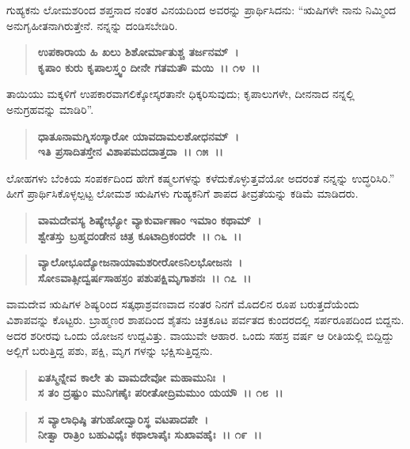 ಗುಹ್ಯಕನು ಲೋಮಶರಿಂದ ಶಪ್ತನಾದ ನಂತರ ವಿನಯದಿಂದ ಅವರನ್ನು ಪ್ರಾರ್ಥಿಸಿದನು: “ಋಷಿಗಳೇ ನಾನು ನಿಮ್ಮಿಂದ ಅನುಗೃಹೀತನಾಗಿರುತ್ತೇನೆ. ನನ್ನನ್ನು ದಂಡಿಸಬೇಡಿರಿ.

\begin{verse}
\textbf{ಉಪಕಾರಾಯ ಹಿ ಖಲು ಶಿಶೋರ್ಮಾತುಶ್ಚ ತರ್ಜನಮ್~।}\\\textbf{ಕೃಪಾಂ ಕುರು ಕೃಪಾಲಸ್ತ್ವಂ ದೀನೇ ಗತಮತೌ ಮಯಿ~।। ೧೪~।।}
\end{verse}

ತಾಯಿಯು ಮಕ್ಕಳಿಗೆ ಉಪಕಾರವಾಗಲಿಕ್ಕೋಸ್ಕರತಾನೇ ಧಿಕ್ಕರಿಸುವುದು; ಕೃಪಾಲುಗಳೇ, ದೀನನಾದ ನನ್ನಲ್ಲಿ ಅನುಗ್ರಹವನ್ನು ಮಾಡಿರಿ”.

\begin{verse}
\textbf{ಧಾತೂನಾಮಗ್ನಿಸಂಸ್ಕಾರೋ ಯಾವದಾಮಲಶೋಧನಮ್~।}\\\textbf{ಇತಿ ಪ್ರಸಾದಿತಸ್ತೇನ ವಿಶಾಪಮದದಾತ್ತದಾ~।। ೧೫~।।}
\end{verse}

ಲೋಹಗಳು ಬೆಂಕಿಯ ಸಂಪರ್ಕದಿಂದ ಹೇಗೆ ಕಷ್ಮಲಗಳನ್ನು ಕಳೆದುಕೊಳ್ಳುತ್ತವೆಯೋ ಅದರಂತೆ ನನ್ನನ್ನು ಉದ್ಧರಿಸಿರಿ.” ಹೀಗೆ ಪ್ರಾರ್ಥಿಸಿಕೊಳ್ಳಲ್ಪಟ್ಟ ಲೋಮಶ ಋಷಿಗಳು ಗುಹ್ಯಕನಿಗೆ ಶಾಪದ ತೀವ್ರತೆಯನ್ನು ಕಡಿಮೆ ಮಾಡಿದರು.

\begin{verse}
\textbf{ವಾಮದೇವಸ್ಯ ಶಿಷ್ಯೇಭ್ಯೋ ವ್ಯಾಕುರ್ವಾಣಾಂ ಇಮಾಂ ಕಥಾಮ್~।}\\\textbf{ಶ್ವೇತಸ್ತು ಬ್ರಹ್ಮದಂಡೇನ ಚಿತ್ರ ಕೂಟಾದ್ರಿಕಂದರೇ~।। ೧೬~।।}
\end{verse}

\begin{verse}
\textbf{ವ್ಯಾಲೋಭೂದ್ಯೋಜನಾಯಾಮಶರೀರೋಽನಿಲಭೋಜನಃ~।}\\\textbf{ಸೋಽವಾತ್ಸೀದ್ವರ್ಷಸಾಹಸ್ರಂ ಪಶುಪಕ್ಷಿಮೃಗಾಶನಃ~।। ೧೭~।।}
\end{verse}

ವಾಮದೇವ ಋಷಿಗಳ ಶಿಷ್ಯರಿಂದ ಸತ್ಕಥಾಶ್ರವಣವಾದ ನಂತರ ನಿನಗೆ ಮೊದಲಿನ ರೂಪ ಬರುತ್ತದೆಯೆಂದು ವಿಶಾಪವನ್ನು ಕೊಟ್ಟರು. ಬ್ರಾಹ್ಮಣರ ಶಾಪದಿಂದ ಶೈತನು ಚಿತ್ರಕೂಟ ಪರ್ವತದ ಕುಂದರದಲ್ಲಿ ಸರ್ಪರೂಪದಿಂದ ಬಿದ್ದನು. ಅದರ ಶರೀರವು ಒಂದು ಯೋಜನ ಉದ್ದವಿತ್ತು. ವಾಯುವೇ ಆಹಾರ. ಒಂದು ಸಹಸ್ರ ವರ್ಷ ಆ ರೀತಿಯಲ್ಲಿ ಬಿದ್ದಿದ್ದು ಅಲ್ಲಿಗೆ ಬರುತ್ತಿದ್ದ ಪಶು, ಪಕ್ಷಿ, ಮೃಗ ಗಳನ್ನು ಭಕ್ಷಿಸುತ್ತಿದ್ದನು.

\begin{verse}
\textbf{ಏತಸ್ಮಿನ್ನೇವ ಕಾಲೇ ತು ವಾಮದೇವೋ ಮಹಾಮುನಿಃ~।}\\\textbf{ಸ ತಂ ದ್ರಷ್ಟುಂ ಮುನಿಗಣೈಃ ಪರೀತೋದ್ರಿಮಮುಂ ಯಯೌ~।। ೧೮~।। }
\end{verse}

\begin{verse}
\textbf{ಸ ವ್ಯಾಲಾಧಿಷ್ಠಿ ತಗುಹೋದ್ವಾರಿಸ್ಥ ವಟಪಾದಪೇ~।}\\\textbf{ನೀತ್ವಾ ರಾತ್ರಿಂ ಬಹುವಿಧೈಃ ಕಥಾಲಾಪೈಃ ಸುಖಾವಹೈಃ~।। ೧೯~।।}
\end{verse}

